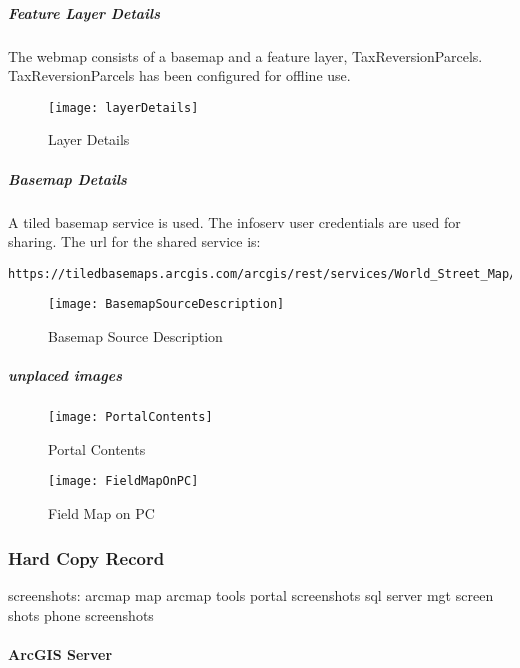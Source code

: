 \documentclass[class=article , crop=false, titlepage, twoside, multi={itemize, figure, verbatim}, float=false]{standalone}
\begin{document}
\subparagraph{Feature Layer Details}The webmap consists of a basemap and a feature layer, TaxReversionParcels.  TaxReversionParcels has been configured for offline use.
\begin{figure}[h!]
\centering
\texttt{[image: layerDetails]}
\caption{Layer Details}
\end{figure}
\clearpage







\subparagraph{Basemap Details}A tiled basemap service is used.  The infoserv user credentials are used for sharing.  The url for the shared service is:
\begin{verbatim}
https://tiledbasemaps.arcgis.com/arcgis/rest/services/World_Street_Map/MapServer
\end{verbatim}
\begin{figure}[h!]
\centering
\texttt{[image: BasemapSourceDescription]}
\caption{Basemap Source Description}
\end{figure}
\clearpage


\subparagraph{unplaced images}
\begin{figure}[h!]
\centering
\texttt{[image: PortalContents]}
\caption{Portal Contents}
\end{figure}

\begin{figure}[h!]
\centering
\texttt{[image: FieldMapOnPC]}
\caption{Field Map on PC}
\end{figure}

\clearpage
\subsubsection{Hard Copy Record}
screenshots:
arcmap map 
arcmap tools
portal screenshots
sql server mgt screen shots
phone screenshots

\paragraph{ArcGIS Server}
\end{document}
